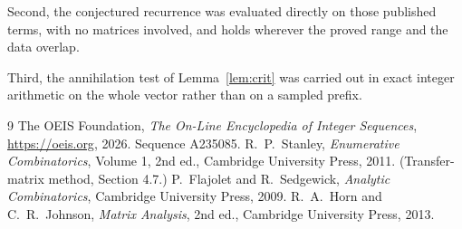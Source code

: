 \documentclass[11pt,a4paper]{article}
\theoremstyle{plain}
\theoremstyle{definition}
\begin{document}
Second, the conjectured recurrence was evaluated directly on those published terms, with no
matrices involved, and holds wherever the proved range and the data overlap.

Third, the annihilation test of Lemma~\ref{lem:crit} was carried out in exact integer
arithmetic on the whole vector rather than on a sampled prefix.

\begin{thebibliography}{9}
 The OEIS Foundation, \emph{The On-Line Encyclopedia of Integer
Sequences}, \url{https://oeis.org}, 2026. Sequence A235085.
 R.~P.~Stanley, \emph{Enumerative Combinatorics}, Volume 1, 2nd ed.,
Cambridge University Press, 2011. (Transfer-matrix method, Section 4.7.)
 P.~Flajolet and R.~Sedgewick, \emph{Analytic Combinatorics}, Cambridge
University Press, 2009.
 R.~A.~Horn and C.~R.~Johnson, \emph{Matrix Analysis}, 2nd ed., Cambridge
University Press, 2013.
\end{thebibliography}
\end{document}
